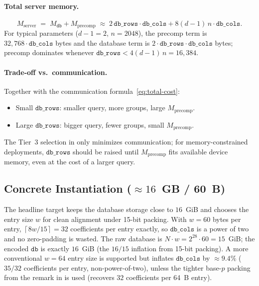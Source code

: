 \documentclass[11pt,a4paper]{article}
\newcommand{\ceil}[1]{\left\lceil #1 \right\rceil}
\begin{document}
\paragraph{Total server memory.}
\begin{equation}
M_{\mathrm{server}} \;=\; M_{\texttt{db}} + M_{\mathrm{precomp}} \;\approx\; 2\, \texttt{db\_rows} \cdot \texttt{db\_cols} + 8(d\!-\!1)\, n \cdot \texttt{db\_cols}.
\label{eq:mem-server}
\end{equation}
For typical parameters ($d\!-\!1 = 2$, $n = 2048$), the precomp term is $32{,}768 \cdot \texttt{db\_cols}$ bytes and the database term is $2 \cdot \texttt{db\_rows} \cdot \texttt{db\_cols}$ bytes; precomp dominates whenever $\texttt{db\_rows} < 4(d\!-\!1)\,n = 16{,}384$.

\paragraph{Trade-off vs.\ communication.}
Together with the communication formula~\eqref{eq:total-cost}:
\begin{itemize}[nosep]
    \item Small $\texttt{db\_rows}$: smaller query, more groups, large $M_{\mathrm{precomp}}$.
    \item Large $\texttt{db\_rows}$: bigger query, fewer groups, small $M_{\mathrm{precomp}}$.
\end{itemize}
The Tier~3 selection in  only minimizes communication; for memory-constrained deployments, $\texttt{db\_rows}$ should be raised until $M_{\mathrm{precomp}}$ fits available device memory, even at the cost of a larger query.

\subsection{Concrete Instantiation ($\approx\!16$~GB / 60~B)}\label{sec:concrete}

The headline target keeps the database storage close to $16$~GiB and chooses the entry size $w$ for clean alignment under 15-bit packing.
With $w = 60$ bytes per entry, $\ceil{8w/15} = 32$ coefficients per entry exactly, so $\texttt{db\_cols}$ is a power of two and no zero-padding is wasted.
The raw database is $N \cdot w = 2^{28} \cdot 60 = 15$~GiB; the encoded $\texttt{db}$ is exactly $16$~GiB (the $16/15$ inflation from 15-bit packing).
A more conventional $w = 64$ entry size is supported but inflates $\texttt{db\_cols}$ by $\approx 9.4\%$ ($35/32$ coefficients per entry, non-power-of-two), unless the tighter base-$p$ packing from the remark in  is used (recovers $32$ coefficients per 64~B entry).
\end{document}

